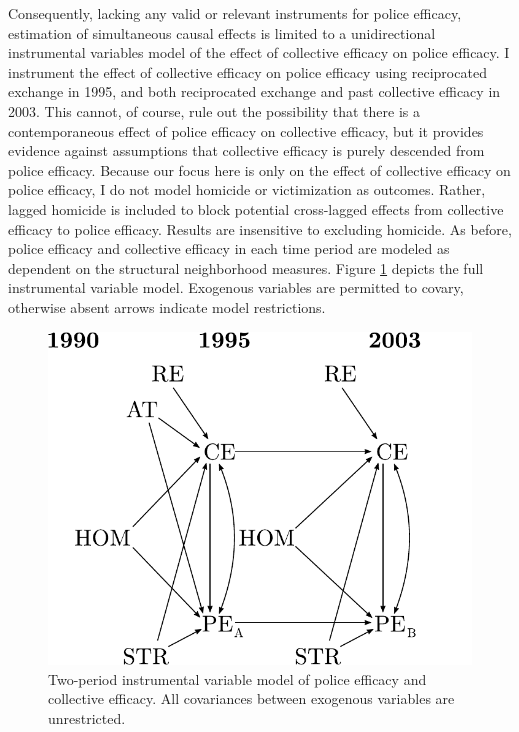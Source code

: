 \documentclass [11pt, proquest] {uwthesis}[2015/03/03]
\begin{document}
Consequently, lacking any valid or relevant instruments for police efficacy, estimation of simultaneous causal effects is limited to a unidirectional instrumental variables model of the effect of collective efficacy on police efficacy. I instrument the effect of collective efficacy on police efficacy using reciprocated exchange in 1995, and both reciprocated exchange and past collective efficacy in 2003. This cannot, of course, rule out the possibility that there is a contemporaneous effect of police efficacy on collective efficacy, but it provides evidence against assumptions that collective efficacy is purely descended from police efficacy. Because our focus here is only on the effect of collective efficacy on police efficacy, I do not model homicide or victimization as outcomes. Rather, lagged homicide is included to block potential cross-lagged effects from collective efficacy to police efficacy. Results are insensitive to excluding homicide. As before, police efficacy and collective efficacy in each time period are modeled as dependent on the structural neighborhood measures. Figure \ref{fig:ivmodel} depicts the full instrumental variable model. Exogenous variables are permitted to covary, otherwise absent arrows indicate model restrictions.\linebreak
\linebreak
\begin{figure}

{\centering \includegraphics[width=0.6\linewidth]{./figure/ch3/iv_model} 

}

\caption[Two-period instrumental variable model of police efficacy and collective efficacy.]{Two-period instrumental variable model of police efficacy and collective efficacy. All covariances between exogenous variables are unrestricted.}\label{fig:ivmodel}
\end{figure}
\end{document}
